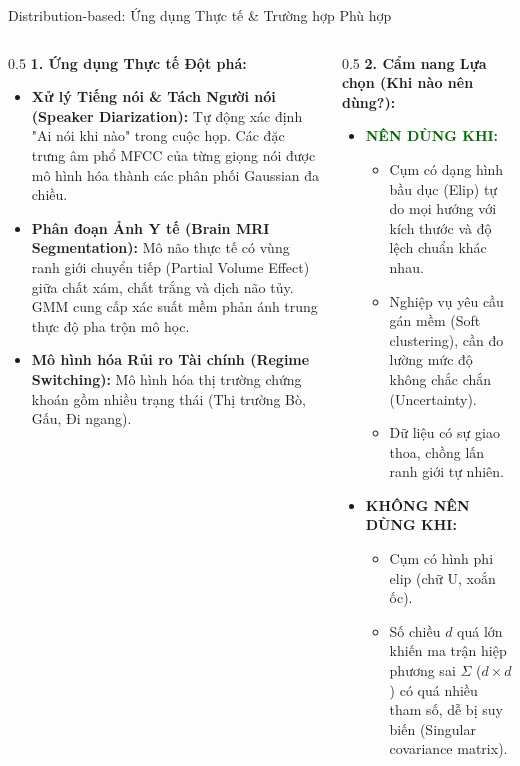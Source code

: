 \documentclass[aspectratio=169,10pt]{beamer}
\begin{document}
\begin{frame}{Distribution-based: Ứng dụng Thực tế \& Trường hợp Phù hợp}
  \small
  \begin{columns}[T]
    \begin{column}{0.5\textwidth}
      \textbf{1. Ứng dụng Thực tế Đột phá:}
      \begin{itemize}\setlength{\itemsep}{2pt}
        \item \textbf{Xử lý Tiếng nói \& Tách Người nói (Speaker Diarization):}
          Tự động xác định "Ai nói khi nào" trong cuộc họp. Các đặc trưng âm phổ MFCC của từng giọng nói được mô hình hóa thành các phân phối Gaussian đa chiều.
        \item \textbf{Phân đoạn Ảnh Y tế (Brain MRI Segmentation):}
          Mô não thực tế có vùng ranh giới chuyển tiếp (Partial Volume Effect) giữa chất xám, chất trắng và dịch não tủy. GMM cung cấp xác suất mềm phản ánh trung thực độ pha trộn mô học.
        \item \textbf{Mô hình hóa Rủi ro Tài chính (Regime Switching):}
          Mô hình hóa thị trường chứng khoán gồm nhiều trạng thái (Thị trường Bò, Gấu, Đi ngang).
      \end{itemize}
    \end{column}
    \begin{column}{0.5\textwidth}
      \textbf{2. Cẩm nang Lựa chọn (Khi nào nên dùng?):}
      \begin{itemize}\setlength{\itemsep}{2pt}
        \item \textcolor{darkgreen}{\textbf{NÊN DÙNG KHI:}}
          \begin{itemize}
            \item Cụm có dạng hình bầu dục (Elip) tự do mọi hướng với kích thước và độ lệch chuẩn khác nhau.
            \item Nghiệp vụ yêu cầu gán mềm (Soft clustering), cần đo lường mức độ không chắc chắn (Uncertainty).
            \item Dữ liệu có sự giao thoa, chồng lấn ranh giới tự nhiên.
          \end{itemize}
        \item \textcolor{crimsonred}{\textbf{KHÔNG NÊN DÙNG KHI:}}
          \begin{itemize}
            \item Cụm có hình phi elip (chữ U, xoắn ốc).
            \item Số chiều $d$ quá lớn khiến ma trận hiệp phương sai $\Sigma$ ($d \times d$) có quá nhiều tham số, dễ bị suy biến (Singular covariance matrix).
          \end{itemize}
      \end{itemize}
    \end{column}
  \end{columns}
\end{frame}
\end{document}
